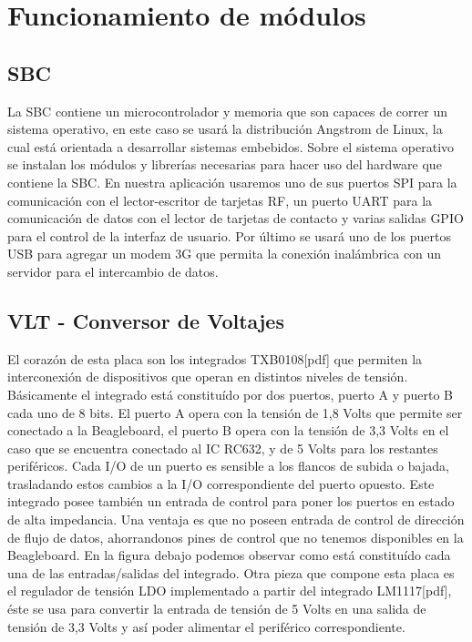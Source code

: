 \section{Funcionamiento de m\'odulos}

\subsection{SBC}
La SBC contiene un microcontrolador y memoria que son capaces de correr un
sistema operativo, en este caso se usará la distribución Angstrom de Linux, la cual
está orientada a desarrollar sistemas embebidos. Sobre el sistema operativo se
instalan los módulos y librerías necesarias para hacer uso del hardware que contiene
la SBC. En nuestra aplicación usaremos uno de sus puertos SPI para la comunicación
con el lector-escritor de tarjetas RF, un puerto UART para la comunicación de datos
con el lector de tarjetas de contacto y varias salidas GPIO para el control de la
interfaz de usuario. Por último se usará uno de los puertos USB para agregar un
modem 3G que permita la conexión inalámbrica con un servidor para el intercambio
de datos.

\subsection{VLT - Conversor de Voltajes}
El corazón de esta placa son los integrados TXB0108[pdf] que permiten la interconexión de dispositivos que operan en distintos niveles de tensión. Básicamente el integrado está constituído por dos puertos, puerto A y puerto B cada uno de 8 bits. El puerto A opera con la tensión de 1,8 Volts que permite ser conectado a la Beagleboard, el puerto B opera con la tensión de 3,3 Volts en el caso que se encuentra conectado al IC RC632, y de 5 Volts para los restantes periféricos.
Cada I/O de un puerto es sensible a los flancos de subida o bajada, trasladando estos cambios a la I/O correspondiente del puerto opuesto. 
Este integrado posee también un entrada de control para poner los puertos en estado de alta impedancia.
Una ventaja es que no poseen entrada de control de dirección de flujo de datos, ahorrandonos pines de control que no tenemos disponibles en la Beagleboard.
En la figura debajo podemos observar como está constituído cada una de las entradas/salidas del integrado.
Otra pieza que compone esta placa es el regulador de tensión LDO implementado a partir del integrado LM1117[pdf], éste se usa para convertir la entrada de tensión de 5 Volts en una salida de tensión de 3,3 Volts y así poder alimentar el periférico correspondiente.

